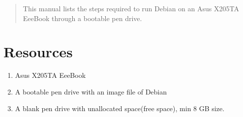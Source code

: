 \documentclass[journal,12pt,twocolumn]{IEEEtran}
\begin{document}
\maketitle

\tableofcontents

\bigskip

\begin{abstract}
This manual lists the steps required to run Debian on an Asus X205TA EeeBook through a bootable pen drive.
\end{abstract}




%
\IEEEpeerreviewmaketitle


%
%

\section{Resources}
\begin{enumerate}
\item Asus X205TA EeeBook 
  \item A bootable pen drive with an image file of Debian
  \item A blank pen drive with unallocated space(free space), min 8 GB size.
\end{enumerate}
\end{document}
